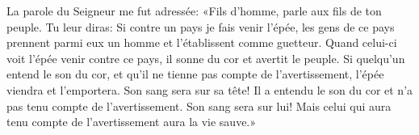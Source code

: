 La parole du Seigneur me fut adressée:
	«Fils d’homme, parle aux fils de ton peuple.
Tu leur diras: Si contre un pays je fais venir l’épée,
	les gens de ce pays prennent parmi eux un homme et l’établissent comme guetteur.
Quand celui-ci voit l’épée venir contre ce pays,
	il sonne du cor et avertit le peuple.
Si quelqu’un entend le son du cor, et qu’il ne tienne pas compte de l’avertissement,
	l’épée viendra et l’emportera.
	Son sang sera sur sa tête!
Il a entendu le son du cor et n’a pas tenu compte de l’avertissement.
	Son sang sera sur lui!
	Mais celui qui aura tenu compte de l’avertissement aura la vie sauve.»

